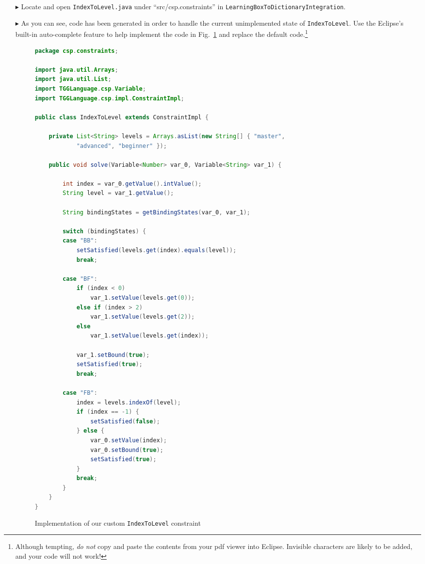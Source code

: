 \begin{itemize}
\item[$\blacktriangleright$] Locate and open \texttt{IndexToLevel.java} under ``src/csp.constraints'' in \texttt{LearningBoxToDictionaryIntegration}.

\item[$\blacktriangleright$] As you can see, code has been generated in order to handle the current unimplemented state of \texttt{IndexToLevel}. Use the
Eclipse's built-in auto-complete feature to help implement the code in Fig.~\ref{code:indexToLevel} and replace the default code.\footnote{Although tempting,
\emph{do not} copy and paste the contents from your pdf viewer into Eclipse. Invisible characters are likely to be added, and your code will not work!}

\begin{figure}[htbp]
\begin{center}
\begin{lstlisting}[language=Java,backgroundcolor=\color{white}, keywordstyle={\bfseries\color{purple}}]
package csp.constraints;

import java.util.Arrays;
import java.util.List;
import TGGLanguage.csp.Variable;
import TGGLanguage.csp.impl.ConstraintImpl;

public class IndexToLevel extends ConstraintImpl {

	private List<String> levels = Arrays.asList(new String[] { "master",
			"advanced", "beginner" });

	public void solve(Variable<Number> var_0, Variable<String> var_1) {

		int index = var_0.getValue().intValue();
		String level = var_1.getValue();

		String bindingStates = getBindingStates(var_0, var_1);

		switch (bindingStates) {
		case "BB":
			setSatisfied(levels.get(index).equals(level));
			break;

		case "BF":
			if (index < 0)
				var_1.setValue(levels.get(0));
			else if (index > 2)
				var_1.setValue(levels.get(2));
			else
				var_1.setValue(levels.get(index));

			var_1.setBound(true);
			setSatisfied(true);
			break;

		case "FB":
			index = levels.indexOf(level);
			if (index == -1) {
				setSatisfied(false);
			} else {
				var_0.setValue(index);
				var_0.setBound(true);
				setSatisfied(true);
			}
			break;
		}
	}
}
\end{lstlisting}
  \caption{Implementation of our custom \texttt{IndexToLevel} constraint}
  \label{code:indexToLevel}
\end{center}
\end{figure}

\end{itemize}

